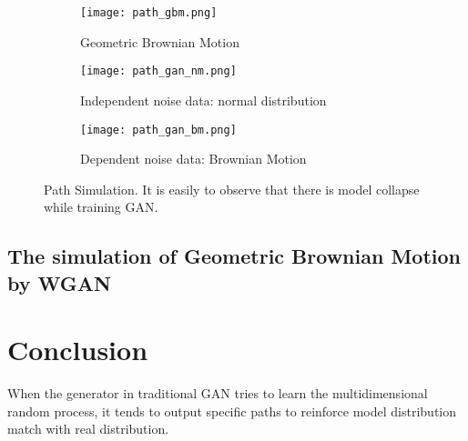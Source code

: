 \documentclass{article}
\begin{document}
	
	
	
	

	\begin{figure}
		\begin{subfigure}[b]{0.5\textwidth}
			\texttt{[image: path\_gbm.png]}
			\caption{Geometric Brownian Motion}
		\end{subfigure}
		\begin{subfigure}[b]{0.5\textwidth}
			\texttt{[image: path\_gan\_nm.png]}
			\caption{Independent noise data: normal distribution}
		\end{subfigure}
		\begin{subfigure}[b]{0.5\textwidth}
			\texttt{[image: path\_gan\_bm.png]}
			\caption{Dependent noise data: Brownian Motion}
		\end{subfigure}
	\caption{Path Simulation. It is easily to observe that there is model collapse while training GAN.}
	\label{fig:path_gan}
	\end{figure}


	\subsection{The simulation of Geometric Brownian Motion by WGAN}
	
	\section{Conclusion}
	
	When the generator in traditional GAN tries to learn the multidimensional random process, it tends to output specific paths to reinforce model distribution match with real distribution. 


	
	

	
	
	
	
	
	
\end{document}

